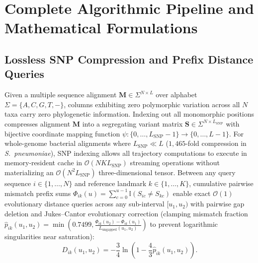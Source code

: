 \section{Complete Algorithmic Pipeline and Mathematical Formulations}
\label{supp:algorithms}

\subsection{Lossless SNP Compression and Prefix Distance Queries}
Given a multiple sequence alignment $\mathbf{M} \in \Sigma^{N \times L}$ over alphabet $\Sigma = \{A, C, G, T, -\}$, columns exhibiting zero polymorphic variation across all $N$ taxa carry zero phylogenetic information.
Indexing out all monomorphic positions compresses alignment $\mathbf{M}$ into a segregating variant matrix $\mathbf{S} \in \Sigma^{N \times L_{\mathrm{SNP}}}$ with bijective coordinate mapping function $\psi: \{0, \dots, L_{\mathrm{SNP}}-1\} \to \{0, \dots, L-1\}$.
For whole-genome bacterial alignments where $L_{\mathrm{SNP}} \ll L$ ($1{,}465$-fold compression in \textit{S.~pneumoniae}), SNP indexing allows all trajectory computations to execute in memory-resident cache in $\mathcal{O}(N K L_{\mathrm{SNP}})$ streaming operations without materializing an $\mathcal{O}(N^2 L_{\mathrm{SNP}})$ three-dimensional tensor.
Between any query sequence $i \in \{1, \dots, N\}$ and reference landmark $k \in \{1, \dots, K\}$, cumulative pairwise mismatch prefix sums $\Phi_{ik}(u) = \sum_{c=0}^{u-1} \mathbb{I}(S_{ic} \ne S_{kc})$ enable exact $\mathcal{O}(1)$ evolutionary distance queries across any sub-interval $[u_1, u_2)$ with pairwise gap deletion and Jukes--Cantor evolutionary correction (clamping mismatch fraction $\hat{p}_{ik}(u_1, u_2) = \min\!\left(0.7499, \frac{\Phi_{ik}(u_2) - \Phi_{ik}(u_1)}{L_{\mathrm{ungapped}}(u_1, u_2)}\right)$ to prevent logarithmic singularities near saturation):
\begin{equation}
D_{ik}(u_1, u_2) = -\frac{3}{4} \ln\left(1 - \frac{4}{3} \hat{p}_{ik}(u_1, u_2)\right).
\end{equation}

